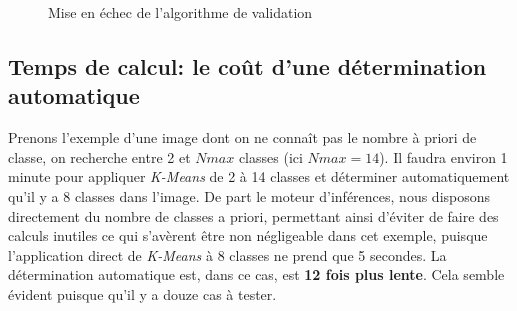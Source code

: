 	\begin{figure}[!ht]	%
	  	\centering
			\caption{Mise en échec de l'algorithme de validation}
	\end{figure}
%	
	
	
	\subsection*{Temps de calcul: le coût d'une détermination automatique}
	Prenons l'exemple d'une image dont on ne connaît pas le nombre à priori de classe, on recherche entre 2 et $Nmax$ classes (ici $Nmax=14$). Il faudra environ 1 minute pour appliquer \emph{K-Means} de 2 à 14 classes et déterminer automatiquement qu'il y a 8 classes dans l'image. De part le moteur d'inférences, nous disposons directement du nombre de classes a priori, permettant ainsi d'éviter de faire des calculs inutiles ce qui s'avèrent être non négligeable dans cet exemple, puisque l'application direct de \emph{K-Means} à 8 classes ne prend que 5 secondes. La détermination automatique est, dans ce cas, est \textbf{12 fois plus lente}. Cela semble évident puisque qu'il y a douze cas à tester.


